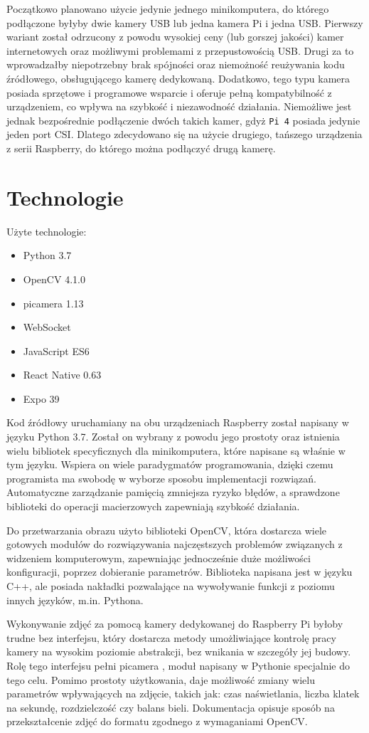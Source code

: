 Początkowo planowano użycie jedynie jednego minikomputera, do którego podłączone byłyby dwie kamery USB lub jedna kamera Pi i jedna USB. Pierwszy wariant został odrzucony z powodu wysokiej ceny (lub gorszej jakości) kamer internetowych oraz możliwymi problemami z przepustowością USB. Drugi za to wprowadzałby niepotrzebny brak spójności oraz niemożność reużywania kodu źródłowego, obsługującego kamerę dedykowaną. Dodatkowo, tego typu kamera posiada sprzętowe i programowe wsparcie i oferuje pełną kompatybilność z urządzeniem, co wpływa na szybkość i niezawodność działania. Niemożliwe jest jednak bezpośrednie podłączenie dwóch takich kamer, gdyż \verb|Pi 4| posiada jedynie jeden port CSI. Dlatego zdecydowano się na użycie drugiego, tańszego urządzenia z serii Raspberry, do którego można podłączyć drugą kamerę. 
\clearpage
\section{Technologie}
Użyte technologie:
\begin{itemize}
  \item Python 3.7
  \item OpenCV 4.1.0
  \item picamera 1.13
  \item WebSocket
  \item JavaScript ES6
  \item React Native 0.63
  \item Expo 39
\end{itemize}

Kod źródłowy uruchamiany na obu urządzeniach Raspberry został napisany w języku Python 3.7. Został on wybrany z powodu jego prostoty oraz istnienia wielu bibliotek specyficznych dla minikomputera, które napisane są właśnie w tym języku. Wspiera on wiele paradygmatów programowania, dzięki czemu programista ma swobodę w wyborze sposobu implementacji rozwiązań. Automatyczne zarządzanie pamięcią zmniejsza ryzyko błędów, a sprawdzone biblioteki do operacji macierzowych zapewniają szybkość działania.

Do przetwarzania obrazu użyto biblioteki OpenCV, która dostarcza wiele gotowych modułów do rozwiązywania najczęstszych problemów związanych z widzeniem komputerowym, zapewniając jednocześnie duże możliwości konfiguracji, poprzez dobieranie parametrów. Biblioteka napisana jest w języku C++, ale posiada nakładki pozwalające na wywoływanie funkcji z poziomu innych języków, m.in. Pythona.

Wykonywanie zdjęć za pomocą kamery dedykowanej do Raspberry Pi byłoby trudne bez interfejsu, który dostarcza metody umożliwiające kontrolę pracy kamery na wysokim poziomie abstrakcji, bez wnikania w szczegóły jej budowy. Rolę tego interfejsu pełni picamera \cite{picamera}, moduł napisany w Pythonie specjalnie do tego celu. Pomimo prostoty użytkowania, daje możliwość zmiany wielu parametrów wpływających na zdjęcie, takich jak: czas naświetlania, liczba klatek na sekundę, rozdzielczość czy balans bieli. Dokumentacja opisuje sposób na przekształcenie zdjęć do formatu zgodnego z wymaganiami OpenCV.

